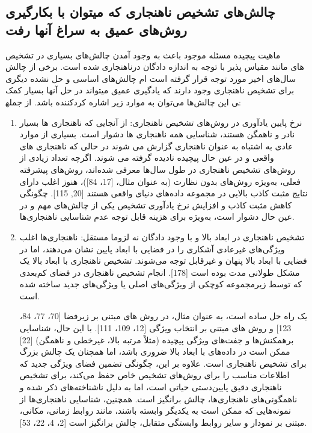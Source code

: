 \documentclass[12pt,a4paper]{report}
\theoremstyle{definition}
\theoremstyle{definition}
\begin{document}
\subsection{چالش‌های تشخیص ناهنجاری که میتوان با بکارگیری روش‌های عمیق به سراغ آنها رفت }
ماهیت پیچیده مسئله موجود باعث به وجود آمدن چالش‌های بسیاری در تشخیص ناهنجاری شده است. برخی از چالش‌‎های مانند مقیاس پذیر با توجه به اندازه دادگان در سال‌های اخیر مورد توجه قرار گرفته است ام چالش‌های اساسی و حل نشده دیگری برای تشخیص ناهنجاری وجود دارند که یادگیری عمیق میتواند در حل آنها بسیار کمک کننده باشد. از جمله‎ی این چالش‌ها می‌توان به موارد زیر اشاره کرد:
\begin{enumerate}
\item{
	نرخ پایین یادآوری در روش‌های تشخیص ناهنجاری:
از آنجایی که ناهنجاری ها بسیار نادر و ناهمگن هستند، شناسایی همه ناهنجاری ها دشوار است. بسیاری از موارد عادی به اشتباه به عنوان ناهنجاری گزارش می شوند در حالی که ناهنجاری های واقعی و در عین حال پیچیده نادیده گرفته می شوند. اگرچه تعداد زیادی از روش‌های تشخیص ناهنجاری در طول سال‌ها معرفی شده‌اند، روش‌های پیشرفته فعلی، به‌ویژه روش‌های بدون نظارت (به عنوان مثال، [17، 84])، هنوز اغلب دارای نتایج مثبت کاذب بالایی در مجموعه داده‌های دنیای واقعی هستند [20, 115]. چگونگی کاهش مثبت کاذب و افزایش نرخ یادآوری تشخیص یکی از چالش‌های مهم و در عین حال دشوار است، به‌ویژه برای هزینه قابل توجه عدم شناسایی ناهنجاری‌ها.
}

\item {
	تشخیص ناهنجاری در ابعاد بالا و با وجود دادگان نه لزوما مستقل:
ناهنجاری‌ها اغلب ویژگی‌های غیرعادی آشکاری را در فضایی با ابعاد پایین نشان می‌دهند، اما در فضایی با ابعاد بالا پنهان و غیرقابل توجه می‌شوند. تشخیص ناهنجاری با ابعاد بالا یک مشکل طولانی مدت بوده است [178]. انجام تشخیص ناهنجاری در فضای کم‌بعدی که توسط زیرمجموعه کوچکی از ویژگی‌های اصلی یا ویژگی‌های جدید ساخته شده است.

یک راه حل ساده است، به عنوان مثال، در روش های مبتنی بر زیرفضا [70، 77، 84، 123] و روش های مبتنی بر انتخاب ویژگی [12، 109، 111]. با این حال، شناسایی برهمکنش‌ها و جفت‌های ویژگی پیچیده (مثلاً مرتبه بالا، غیرخطی و ناهمگن) [22] ممکن است در داده‌های با ابعاد بالا ضروری باشد، اما همچنان یک چالش بزرگ برای تشخیص ناهنجاری است. علاوه بر این، چگونگی تضمین فضای ویژگی جدید که اطلاعات مناسب را برای روش‌های تشخیص خاص حفظ می‌کند، برای تشخیص ناهنجاری دقیق پایین‌دستی حیاتی است، اما به دلیل ناشناخته‌های ذکر شده و ناهمگونی‌های ناهنجاری‌ها، چالش برانگیز است. همچنین، شناسایی ناهنجاری‌ها از نمونه‌هایی که ممکن است به یکدیگر وابسته باشند، مانند روابط زمانی، مکانی، مبتنی بر نمودار و سایر روابط وابستگی متقابل، چالش برانگیز است [2، 4، 22، 53].
}


\end{enumerate}
\end{document}
